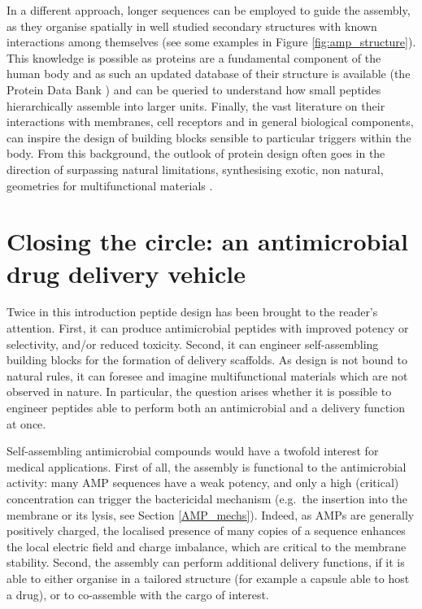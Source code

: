 In a different approach, longer sequences can be employed to guide the assembly, as they organise spatially in well studied secondary structures with known interactions among themselves (see some examples in Figure \ref{fig:amp_structure}).
%
This knowledge is possible as proteins are a fundamental component of the human body and as such an updated database of their structure is available (the Protein Data Bank \citep{PDB}) and can be queried to understand how small peptides hierarchically assemble into larger units.
%
Finally, the vast literature on their interactions with membranes, cell receptors and in general biological components, can inspire the design of building blocks sensible to particular triggers within the body. From this background, the outlook of protein design often goes in the direction of surpassing natural limitations, synthesising exotic, non natural, geometries for multifunctional materials \citep{Yeates2019,Malay2019}.


\section{Closing the circle: an antimicrobial drug delivery vehicle}

Twice in this introduction peptide design has been brought to the reader's attention. First, it can produce antimicrobial peptides with improved potency or selectivity, and/or reduced toxicity. Second, it can engineer self-assembling building blocks for the formation of delivery scaffolds. As design is not bound to natural rules, it can foresee and imagine multifunctional materials which are not observed in nature. In particular, the question arises whether it is possible to engineer peptides able to perform both an antimicrobial and a delivery function at once.

Self-assembling antimicrobial compounds would have a twofold interest for medical applications.
%
First of all, the assembly is functional to the antimicrobial activity: many AMP sequences have a weak potency, and only a high (critical) concentration can trigger the bactericidal mechanism (e.g.\ the insertion into the membrane or its lysis, see Section \ref{AMP_mechs}).
%
Indeed, as AMPs are generally positively charged, the localised presence of many copies of a sequence enhances the local electric field and charge imbalance, which are critical to the membrane stability. 
%
Second, the assembly can perform additional delivery functions, if it is able to either organise in a tailored structure (for example a capsule able to host a drug), or to co-assemble with the cargo of interest.

